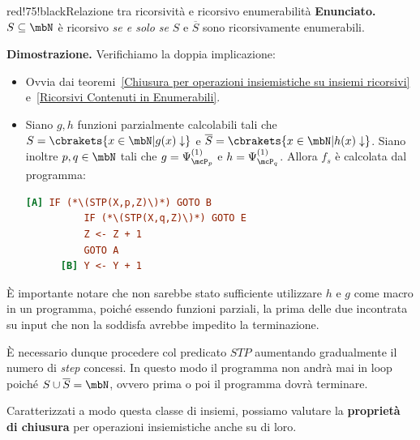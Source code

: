 \begin{halfframedbox}{red!75!black}{Relazione tra ricorsività e ricorsivo enumerabilità}\label{Relazione tra ricorsività e ricorsivo enumerabilità}
  \textbf{Enunciato. } \(S \subseteq \mbN\) è ricorsivo \textit{se e solo se} \(S\) e \(\overline{S}\) sono ricorsivamente enumerabili.
  \begin{center}
    \textcolor{red!75!black}{\hdashrule[0.5ex]{18cm}{1pt}{3mm 3pt 1mm 2pt}}
  \end{center}
  \textbf{Dimostrazione. } Verifichiamo la doppia implicazione:
  \begin{itemize}
    \item [\(\Longrightarrow\)] Ovvia dai teoremi~\ref{Chiusura per operazioni insiemistiche su insiemi ricorsivi} e~\ref{Ricorsivi Contenuti in Enumerabili}.
    \item [\(\Longleftarrow\)] Siano \(g,h\) funzioni parzialmente calcolabili tali che \(S=\cbrakets{x \in \mbN \vert g(x) \downarrow}\) e \(\overline{S}=\cbrakets{x \in \mbN \vert h(x) \downarrow}\). Siano inoltre \(p,q\in\mbN\) tali che \(g=\Psi_{\mcP_p}^{(1)}\) e \(h=\Psi_{\mcP_q}^{(1)}\). Allora \(f_s\) è calcolata dal programma:
    \begin{lstlisting}[language=ini, caption={ }]
      [A] IF (*\(STP(X,p,Z)\)*) GOTO B
          IF (*\(STP(X,q,Z)\)*) GOTO E
          Z <- Z + 1
          GOTO A
      [B] Y <- Y + 1
    \end{lstlisting}
  \end{itemize}
  È importante notare che non sarebbe stato sufficiente utilizzare \(h\) e \(g\) come macro in un programma, poiché essendo funzioni parziali, la prima delle due incontrata su input che non la soddisfa avrebbe impedito la terminazione.

  È necessario dunque procedere col predicato \(STP\) aumentando gradualmente il numero di \textit{step} concessi. In questo modo il programma non andrà mai in loop poiché \(S \cup \overline{S}=\mbN\), ovvero prima o poi il programma dovrà terminare.
\end{halfframedbox}

Caratterizzati a modo questa classe di insiemi, possiamo valutare la \textbf{proprietà di chiusura} per operazioni insiemistiche anche su di loro.

